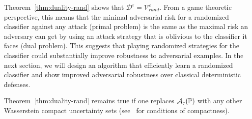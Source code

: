 Theorem~\ref{thm:duality-rand} shows that $\mathcal{D}^\varepsilon=\mathcal{V}_{rand}^\varepsilon$. From a game theoretic perspective, this means that the minimal adversarial risk for a randomized classifier against any attack (primal problem) is the same as the maximal risk an adversary can get by using an attack strategy that is oblivious to the classifier it faces (dual problem). This suggests that playing randomized strategies for the classifier could substantially improve robustness to adversarial examples.
In the next section, we will design an algorithm that efficiently learn a randomized classifier and show improved adversarial robustness over classical deterministic defenses.


\begin{rmq}
Theorem~\ref{thm:duality-rand} remains true if one replaces $\mathcal{A}_\varepsilon(\mathbb{P})$ with any other Wasserstein compact uncertainty sets (see~\citep{yue2020linear} for conditions of compactness). 
\end{rmq}



